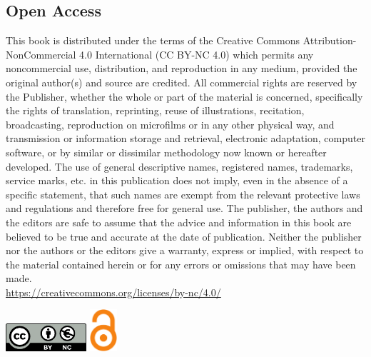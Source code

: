 \begin{multicols*}{2}
\section*{Open Access}
\label{awec:openaccesslicense}

This book is distributed under the terms of the Creative Commons Attribution-NonCommercial 4.0 International (CC BY-NC 4.0) which permits any noncommercial use, distribution, and reproduction in any medium, provided the original author(s) and source are credited. All commercial rights are reserved by the Publisher, whether the whole or part of the material is concerned, specifically the rights of translation, reprinting, reuse of illustrations, recitation, broadcasting, reproduction on microfilms or in any other physical way, and transmission or information storage and retrieval, electronic adaptation, computer software, or by similar or dissimilar methodology now known or hereafter developed. The use of general descriptive names, registered names, trademarks, service marks, etc. in this publication does not imply, even in the absence of a specific statement, that such names are exempt from the relevant protective laws and regulations and therefore free for general use. The publisher, the authors and the editors are safe to assume that the advice and information in this book are believed to be true and accurate at the date of publication. Neither the publisher nor the authors or the editors give a warranty, express or implied, with respect to the material contained herein or for any errors or omissions that may have been made.\\
\href{https://creativecommons.org/licenses/by-nc/4.0/}{https://creativecommons.org/licenses/by-nc/4.0/}

\vfill

\includegraphics[width=3cm]{figures/by-nc-eu.pdf} \hfill \includegraphics[width=1cm]{figures/logo_OA.pdf}

\end{multicols*}
